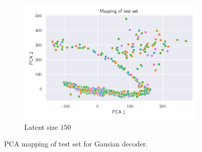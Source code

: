 \documentclass[12pt,a4paper]{article}
\begin{document}
\begin{figure}[H]
    \medskip
    \begin{subfigure}{0.48\textwidth}
    \includegraphics[width=\textwidth]{src/gaussian_pca_150.png}
    \caption{Latent size $150$}
    \end{subfigure}\hspace*{\fill}
    
    \caption{PCA mapping of test set for Gausian decoder.} \label{fig:1}
    \end{figure}
\end{document}
